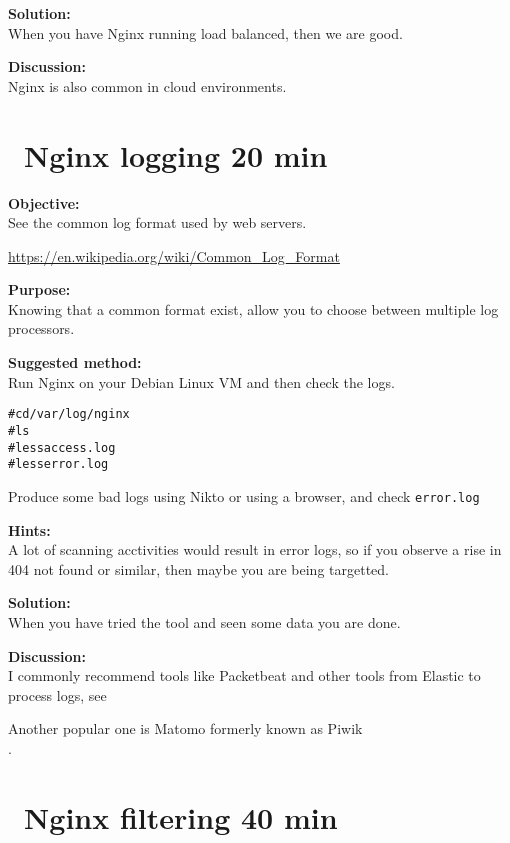 \documentclass[a4paper,11pt,notitlepage]{report}
\begin{document}
{\bf Solution:}\\
When you have Nginx running load balanced, then we are good.

{\bf Discussion:}\\
Nginx is also common in cloud environments.

\chapter{\faExclamationTriangle\ Nginx logging  20 min}
\label{ex:nginx-logging}

{\bf Objective:}\\
See the common log format used by web servers.

\url{https://en.wikipedia.org/wiki/Common_Log_Format}


{\bf Purpose:}\\
Knowing that a common format exist, allow you to choose between multiple log processors.


{\bf Suggested method:}\\
Run Nginx on your Debian Linux VM and then check the logs.


\begin{alltt}
# cd /var/log/nginx
# ls
# less access.log
# less error.log
\end{alltt}


Produce some bad logs using Nikto or using a browser, and check \verb+error.log+


{\bf Hints:}\\
A lot of scanning acctivities would result in error logs, so if you observe a rise in 404 not found or similar, then maybe you are being targetted.

{\bf Solution:}\\
When you have tried the tool and seen some data you are done.

{\bf Discussion:}\\
I commonly recommend tools like Packetbeat and other tools from Elastic to process logs, see 

Another popular one is Matomo formerly known as Piwik\\
.


\chapter{\faExclamationTriangle\ Nginx filtering 40 min}
\label{ex:nginx-filtering}
\end{document}
